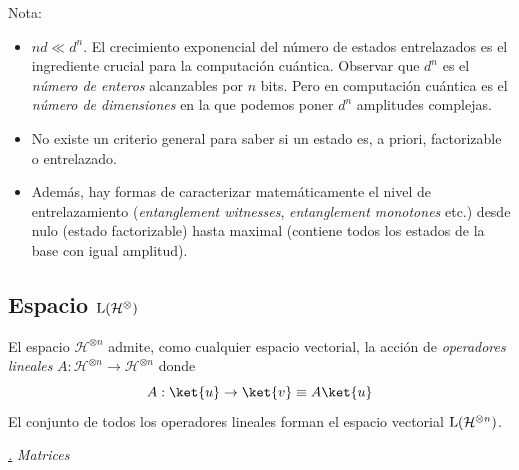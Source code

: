 \documentclass[a4paper,11pt]{book} %
\numberwithin{equation}{chapter}
\def\subsubiContadorIt{\par\addtocounter{subsubsection}{1}\underline{\it\thesubsubsection.}\hskip0.5cm \setcounter{subsubsubsectionIt}{0}}
\newcommand{\SubsubiIt}[1]{
		\subsubiContadorIt \textit{#1}
	}
\newcounter{subsubsubsectionIt}[subsubsection]
\begin{document}
\begin{mybox_blue}{Nota:}
\begin{itemize}
	\item $nd \ll d^n$. El crecimiento exponencial del número de estados entrelazados es el ingrediente crucial para la computación cuántica. Observar que $d^n$ es el \textit{número de enteros} alcanzables por $n$ bits. Pero en computación cuántica es el \textit{número de dimensiones} en la que podemos poner $d^n$ amplitudes complejas.  
\vspace{0.2cm}

	\item No existe un criterio general para saber si un estado es, a priori, factorizable o entrelazado. 
\vspace{0.2cm}

	\item Además, hay formas de caracterizar matemáticamente el nivel de entrelazamiento (\textit{entanglement witnesses}, \textit{entanglement monotones} etc.) desde nulo (estado factorizable) hasta maximal (contiene todos los estados de la base con igual amplitud).
\end{itemize}
\end{mybox_blue}



		\subsection{Espacio ${\rm L}(\mathcal{H}^\otimes)$}

\begin{mybox_gray2}{}
El espacio $\mathcal{H}^{\otimes n}$ admite, como cualquier espacio vectorial, la acción de \textit{operadores lineales} $A: \mathcal{H}^{\otimes n} \to \mathcal{H}^{\otimes n}$ donde
	\begin{equation}
	A:\ket{u} \to \ket{v} \equiv A\ket{u}
	\end{equation}
El conjunto de todos los operadores lineales forman el espacio vectorial ${\rm L}(\mathcal{H}^{\otimes n})$.
\end{mybox_gray2}


			\SubsubiIt{Matrices}
\end{document}
